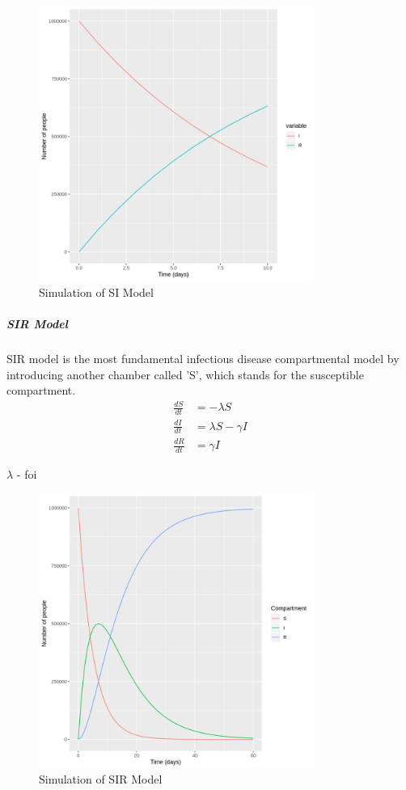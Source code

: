 \documentclass[a4paper, 12pt, twoside]{article}
\begin{document}
\begin{figure}[htpb]
	\centering
	\includegraphics[width=0.8\textwidth]{si-model}
	\caption{Simulation of SI Model}
	\label{fig:si-model}
\end{figure}

\subparagraph{SIR Model}
SIR model is the most fundamental infectious disease compartmental model by introducing another chamber called 'S', which stands for the susceptible compartment.
\begin{align}
	\frac{dS}{dt} & = - \lambda S          \\
	\frac{dI}{dt} & = \lambda S - \gamma I \\
	\frac{dR}{dt} & = \gamma I
\end{align}
\begin{center}
$\lambda$ -  \gls{foi}
\end{center}

\begin{figure}[htpb]
	\centering
	\includegraphics[width=0.8\textwidth]{sir-model}
	\caption{Simulation of SIR Model}
	\label{fig:sir-model}
\end{figure}
\end{document}
